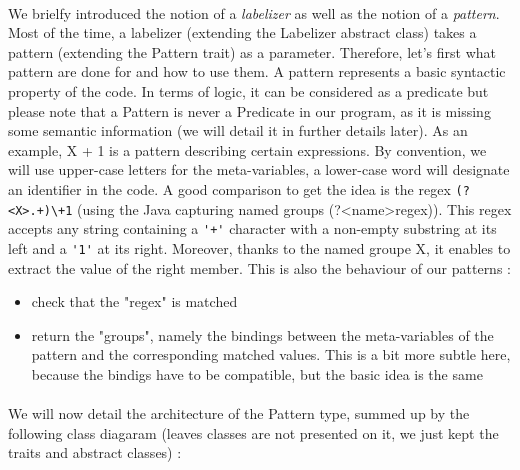 \documentclass{report}
\begin{document}
\paragraph{}
\hspace{4mm}We brielfy introduced the notion of a \textit{labelizer} as well as the notion of a \textit{pattern}. Most of the time, a labelizer (extending the Labelizer abstract class) takes a pattern
(extending the Pattern trait) as a parameter. Therefore, let's first what pattern are done for and how to use them. A pattern represents a basic syntactic property of the code. In terms of logic, 
it can be considered as a predicate but please note that a Pattern is never a Predicate in our program, as it is missing some semantic information (we will detail it in further details later).
As an example, X + 1 is a pattern describing certain expressions. By convention, we will use upper-case letters for the meta-variables, a  lower-case word will designate an identifier in the code. A good comparison to get the idea is the regex \lstinline|(?<X>.+)\+1| (using the Java capturing named groups (?<name>regex)).
This regex accepts any string containing a \lstinline|'+'| character with a non-empty substring at its left and a \lstinline|'1'| at its right. Moreover, thanks to the named groupe X, 
it enables to extract the value of the right member. This is also the behaviour of our patterns :

\vspace{1.5mm}
\begin{itemize}
\item check that the "regex" is matched\vspace{1mm}
\item return the "groups", namely the bindings between the meta-variables of the pattern and the corresponding 
matched values. This is a bit more subtle here, because the bindigs have to be compatible, but the basic idea is the same\vspace{1mm}
\end{itemize}

\paragraph{}
\hspace{4mm}We will now detail the architecture of the Pattern type, summed up by the following class diagaram (leaves classes are not presented on it,
we just kept the traits and abstract classes) :
\end{document}
